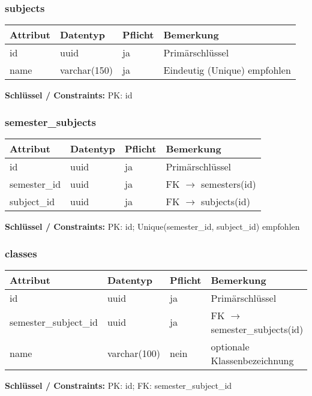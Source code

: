 \documentclass[12pt,a4paper]{article}
\begin{document}
    \subsubsection{subjects}
    \begin{longtable}{|p{4cm}|p{3cm}|p{3cm}|p{4cm}|}
        \hline
        \textbf{Attribut} & \textbf{Datentyp} & \textbf{Pflicht} & \textbf{Bemerkung} \\ \hline
        id & uuid & ja & Primärschlüssel \\ \hline
        name & varchar(150) & ja & Eindeutig (Unique) empfohlen \\ \hline
    \end{longtable}
    \textbf{Schlüssel / Constraints:} PK: id

    \subsubsection{semester\_subjects}
    \begin{longtable}{|p{4cm}|p{3cm}|p{3cm}|p{4cm}|}
        \hline
        \textbf{Attribut} & \textbf{Datentyp} & \textbf{Pflicht} & \textbf{Bemerkung} \\ \hline
        id & uuid & ja & Primärschlüssel \\ \hline
        semester\_id & uuid & ja & FK $\rightarrow$ semesters(id) \\ \hline
        subject\_id & uuid & ja & FK $\rightarrow$ subjects(id) \\ \hline
    \end{longtable}
    \textbf{Schlüssel / Constraints:} PK: id; Unique(semester\_id, subject\_id) empfohlen

    \subsubsection{classes}
    \begin{longtable}{|p{4cm}|p{3cm}|p{3cm}|p{4cm}|}
        \hline
        \textbf{Attribut} & \textbf{Datentyp} & \textbf{Pflicht} & \textbf{Bemerkung} \\ \hline
        id & uuid & ja & Primärschlüssel \\ \hline
        semester\_subject\_id & uuid & ja & FK $\rightarrow$ semester\_subjects(id) \\ \hline
        name & varchar(100) & nein & optionale Klassenbezeichnung \\ \hline
    \end{longtable}
    \textbf{Schlüssel / Constraints:} PK: id; FK: semester\_subject\_id
\end{document}
